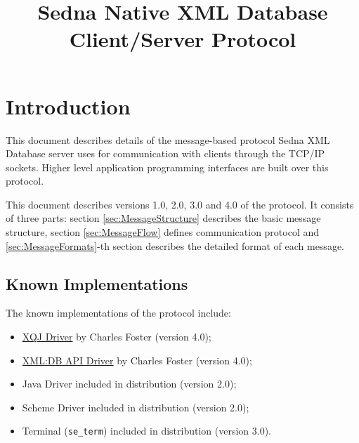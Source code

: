 \documentclass[a4paper,12pt]{article}
\title{Sedna Native XML Database Client/Server Protocol}
\date{}
\newcommand{\TocAt}[6]{}   %
\begin{document}
\sloppy
\maketitle

\TocAt*{section,subsection,subsubsection}
\TocAt*{subsection,subsubsection}

\tableofcontents
\newpage

\section{Introduction}
This document describes details of the message-based protocol Sedna XML Database
server uses for communication with clients through the TCP/IP sockets. Higher
level application programming interfaces are built over this protocol.

This document describes versions 1.0, 2.0, 3.0 and 4.0 of the protocol. It
consists of three parts: section \ref{sec:MessageStructure} describes the basic
message structure, section \ref{sec:MessageFlow} defines communication protocol
and \ref{sec:MessageFormats}-th section describes the detailed format of each
message.


\subsection{Known Implementations}

The known implementations of the protocol include:
\begin{itemize}
\item \href{http://www.xqj.net/sedna/}{XQJ Driver} by Charles Foster
(version 4.0);
\item \href{http://www.cfoster.net/sedna/}{XML:DB API Driver} by Charles Foster
(version 4.0);
\item Java Driver included in distribution (version 2.0);
\item Scheme Driver included in distribution (version 2.0);
\item Terminal (\verb!se_term!) included in distribution (version 3.0).
\end{itemize}

\newpage


\end{document}
